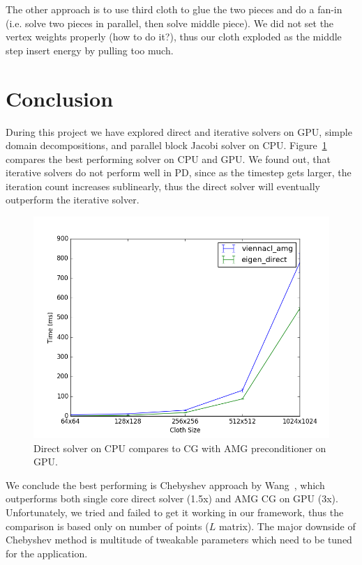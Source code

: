 \documentclass{article}
\begin{document}
The other approach is to use third cloth to glue the two pieces and do a
fan-in (i.e. solve two pieces in parallel, then solve middle piece). We did
not set the vertex weights properly (how to do it?), thus our cloth exploded
as the middle step insert energy by pulling too much.


\section{Conclusion}
During this project we have explored direct and iterative solvers on GPU,
simple domain decompositions, and parallel block Jacobi solver on CPU.
Figure~\ref{fig:amg_direct} compares the best performing solver on CPU and
GPU.
We found out, that iterative solvers do not perform well in PD, since as the
timestep gets larger, the iteration count increases sublinearly, thus the
direct solver will eventually outperform the iterative solver.

\begin{figure}[htb!]
        \centering
        \includegraphics[width=\linewidth]{img/amg_direct.png}
        \caption{Direct solver on CPU compares to CG with AMG preconditioner
                 on GPU.}
        \label{fig:amg_direct}
\end{figure}


We conclude the best performing is Chebyshev approach by Wang~\cite{Wang15},
which outperforms both single core direct solver (1.5x) and AMG CG on GPU (3x).
Unfortunately, we tried and failed to get it working in our framework, thus
the comparison is based only on number of points ($L$ matrix). The major
downside of Chebyshev method is multitude of tweakable parameters which need
to be tuned for the application.


{}

\end{document}
